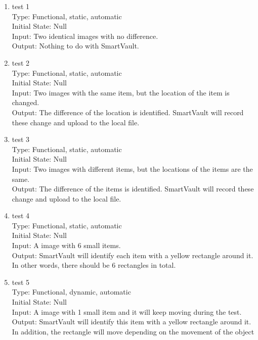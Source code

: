 \documentclass[12pt, titlepage]{article}
\begin{document}
\begin{enumerate}
\item{test 1\\}
Type: Functional, static, automatic\\
Initial State: Null\\
Input: Two identical images with no difference.\\
Output: Nothing to do with SmartVault.\\ 
\item{test 2\\}
Type: Functional, static, automatic\\
Initial State: Null\\
Input: Two images with the same item, but the location of the item is changed.\\
Output: The difference of the location is identified. SmartVault will record these change and upload to the local file.\\ 
\item{test 3\\}
Type: Functional, static, automatic\\
Initial State: Null\\
Input: Two images with different items, but the locations of the items are the same.\\
Output: The difference of the items is identified. SmartVault will record these change and upload to the local file.\\ 
\item{test 4\\}
Type: Functional, static, automatic\\
Initial State: Null\\
Input: A image with 6 small items.\\
Output: SmartVault will identify each item with a yellow rectangle around it. In other words, there should be 6 rectangles in total.\\ 
\item{test 5\\}
Type: Functional, dynamic, automatic\\
Initial State: Null\\
Input: A image with 1 small item and it will keep moving during the test.\\
Output: SmartVault will identify this item with a yellow rectangle around it. In addition, the rectangle will move depending on the movement of the object\\ 
\end{enumerate}
\end{document}

